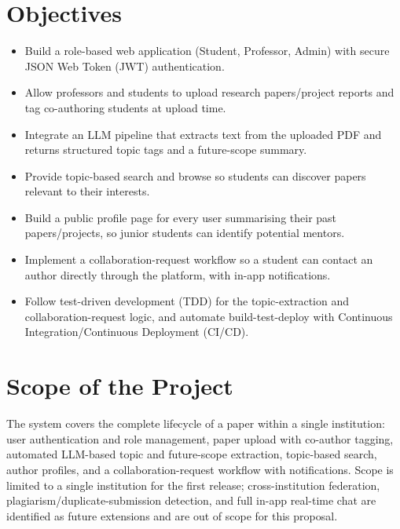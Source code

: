 \documentclass[11pt]{article}
\begin{document}
\section{Objectives}
\begin{itemize}[itemsep=2pt]
    \item Build a role-based web application (Student, Professor, Admin) with secure JSON Web Token (JWT) authentication.
    \item Allow professors and students to upload research papers/project reports and tag co-authoring students at upload time.
    \item Integrate an LLM pipeline that extracts text from the uploaded PDF and returns structured topic tags and a future-scope summary.
    \item Provide topic-based search and browse so students can discover papers relevant to their interests.
    \item Build a public profile page for every user summarising their past papers/projects, so junior students can identify potential mentors.
    \item Implement a collaboration-request workflow so a student can contact an author directly through the platform, with in-app notifications.
    \item Follow test-driven development (TDD) for the topic-extraction and collaboration-request logic, and automate build-test-deploy with Continuous Integration/Continuous Deployment (CI/CD).
\end{itemize}

\section{Scope of the Project}
The system covers the complete lifecycle of a paper within a single institution: user authentication and role management, paper upload with co-author tagging, automated LLM-based topic and future-scope extraction, topic-based search, author profiles, and a collaboration-request workflow with notifications. Scope is limited to a single institution for the first release; cross-institution federation, plagiarism/duplicate-submission detection, and full in-app real-time chat are identified as future extensions and are out of scope for this proposal.
\end{document}
